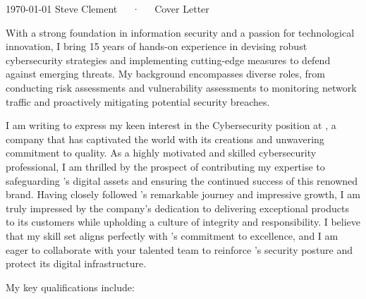 \documentclass[11pt, a4paper]{awesome-cv}
\begin{document}
\makecvheader[R]

\makecvfooter
  {\today}
  {Steve Clement~~~·~~~Cover Letter}
  {}

\makelettertitle

\begin{cvletter}




With a strong foundation in information security and a passion for technological innovation, I bring 15 years of hands-on experience in devising robust cybersecurity strategies and implementing cutting-edge measures to defend against emerging threats. My background encompasses diverse roles, from conducting risk assessments and vulnerability assessments to monitoring network traffic and proactively mitigating potential security breaches.

I am writing to express my keen interest in the Cybersecurity position at , a company that has captivated the world with its  creations and unwavering commitment to quality. As a highly motivated and skilled cybersecurity professional, I am thrilled by the prospect of contributing my expertise to safeguarding 's digital assets and ensuring the continued success of this renowned brand.
Having closely followed 's remarkable journey and impressive growth, I am truly impressed by the company's dedication to delivering exceptional products to its customers while upholding a culture of integrity and responsibility. I believe that my skill set aligns perfectly with 's commitment to excellence, and I am eager to collaborate with your talented team to reinforce 's security posture and protect its digital infrastructure.

My key qualifications include:


\end{cvletter}
\end{document}
